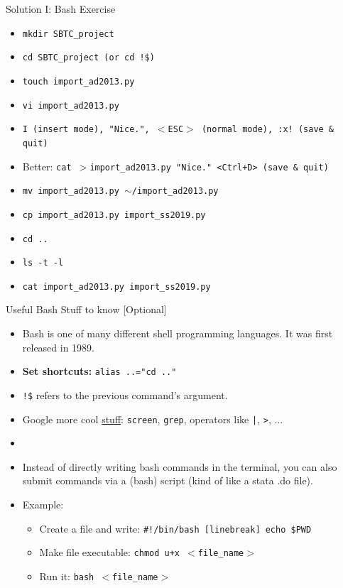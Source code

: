 \documentclass{beamer}
\begin{document}
\begin{frame}{Solution I: Bash Exercise}
    \begin{itemize}
        \item \texttt{mkdir SBTC\_project}
        \item \texttt{cd SBTC\_project (or cd !\$)}
        \item \texttt{touch import\_ad2013.py}
        \item \texttt{vi import\_ad2013.py}
        \item \texttt{I (insert mode), "Nice.", $<$ESC$>$ (normal mode), :x! (save \& quit)}
        \item Better: \texttt{cat $>$import\_ad2013.py "Nice." <Ctrl+D> (save \& quit)}
        \item \texttt{mv import\_ad2013.py $\sim$/import\_ad2013.py}
        \item \texttt{cp import\_ad2013.py import\_ss2019.py}
        \item \texttt{cd ..}
        \item \texttt{ls -t -l}
        \item \texttt{cat import\_ad2013.py import\_ss2019.py}
    \end{itemize}
\end{frame}

\begin{frame}{Useful Bash Stuff to know [Optional]}
    \begin{itemize}
        \item Bash is one of many different shell programming languages. It was first released in 1989.
        \item \textbf{Set shortcuts:} \texttt{alias ..="cd .."}
        \item \texttt{!\$} refers to the previous command's argument.
        \item Google more cool \href{https://unix.stackexchange.com/questions/159513/what-are-the-shells-control-and-redirection-operators}{stuff}: \texttt{screen}, \texttt{grep}, operators like \texttt{|}, \texttt{>}, ...
        \item[]
        \item Instead of directly writing bash commands in the terminal, you can also submit commands via a (bash) script (kind of like a stata .do file).
        \item Example: 
            \begin{itemize}
                \item Create a file and write: \texttt{\#!/bin/bash [linebreak] echo \$PWD}
                \item Make file executable: \texttt{chmod u+x $<$file\_name$>$}
                \item Run it: \texttt{bash $<$file\_name$>$}
            \end{itemize}
    \end{itemize}
\end{frame}
\end{document}
